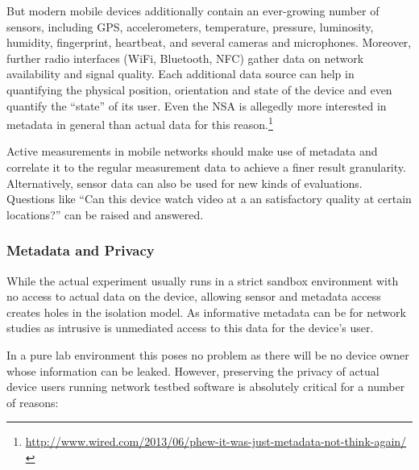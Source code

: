 But modern mobile devices additionally contain an ever-growing number of sensors, including \gls{GPS}, accelerometers, temperature, pressure, luminosity, humidity, fingerprint, heartbeat, and several cameras and microphones. Moreover, further radio interfaces (WiFi, Bluetooth, \acrshort{NFC}) gather data on network availability and signal quality. Each additional data source can help in quantifying the physical position, orientation and state of the device and even quantify the ``state'' of its user. Even the NSA is allegedly more interested in metadata in general than actual data for this reason.\footnote{\url{http://www.wired.com/2013/06/phew-it-was-just-metadata-not-think-again/}}

Active measurements in mobile networks should make use of metadata and correlate it to the regular measurement data to achieve a finer result granularity. Alternatively, sensor data can also be used for new kinds of evaluations. Questions like ``Can this device watch video at a an satisfactory quality at certain locations?'' can be raised and answered.


\subsubsection{Metadata and Privacy}

While the actual experiment usually runs in a strict sandbox environment with no access to actual data on the device, allowing sensor and metadata access creates holes in the isolation model. As informative metadata can be for network studies as intrusive is unmediated access to this data for the device's user.

In a pure lab environment this poses no problem as there will be no device owner whose information can be leaked. However, preserving the privacy of actual device users running network testbed software is absolutely critical for a number of reasons:

